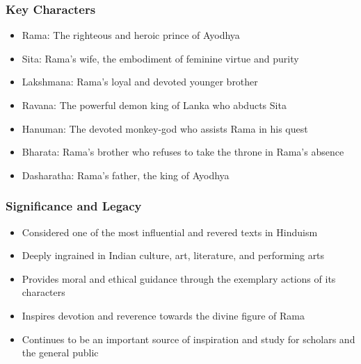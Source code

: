 \begin{frame}[fragile]\frametitle{Key Characters}
    \begin{itemize}
        \item Rama: The righteous and heroic prince of Ayodhya
        \item Sita: Rama's wife, the embodiment of feminine virtue and purity
        \item Lakshmana: Rama's loyal and devoted younger brother
        \item Ravana: The powerful demon king of Lanka who abducts Sita
        \item Hanuman: The devoted monkey-god who assists Rama in his quest
        \item Bharata: Rama's brother who refuses to take the throne in Rama's absence
        \item Dasharatha: Rama's father, the king of Ayodhya
    \end{itemize}
\end{frame}

\begin{frame}[fragile]\frametitle{Significance and Legacy}
    \begin{itemize}
        \item Considered one of the most influential and revered texts in Hinduism
        \item Deeply ingrained in Indian culture, art, literature, and performing arts
        \item Provides moral and ethical guidance through the exemplary actions of its characters
        \item Inspires devotion and reverence towards the divine figure of Rama
        \item Continues to be an important source of inspiration and study for scholars and the general public
    \end{itemize}
\end{frame}
